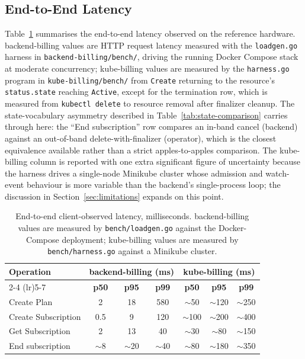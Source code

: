 \subsection{End-to-End Latency}

Table~\ref{tab:e2e-latency} summarises the end-to-end latency observed on the reference hardware. backend-billing values are HTTP request latency measured with the \texttt{loadgen.go} harness in \texttt{backend-billing/bench/}, driving the running Docker Compose stack at moderate concurrency; kube-billing values are measured by the \texttt{harness.go} program in \texttt{kube-billing/bench/} from \texttt{Create} returning to the resource's \texttt{status.state} reaching \texttt{Active}, except for the termination row, which is measured from \texttt{kubectl delete} to resource removal after finalizer cleanup. The state-vocabulary asymmetry described in Table~\ref{tab:state-comparison} carries through here: the ``End subscription'' row compares an in-band cancel (backend) against an out-of-band delete-with-finalizer (operator), which is the closest equivalence available rather than a strict apples-to-apples comparison. The kube-billing column is reported with one extra significant figure of uncertainty because the harness drives a single-node Minikube cluster whose admission and watch-event behaviour is more variable than the backend's single-process loop; the discussion in Section~\ref{sec:limitations} expands on this point.

\begin{table}[h]
\centering
\small
\caption{End-to-end client-observed latency, milliseconds. backend-billing values are measured by \texttt{bench/loadgen.go} against the Docker-Compose deployment; kube-billing values are measured by \texttt{bench/harness.go} against a Minikube cluster.}
\label{tab:e2e-latency}
\begin{tabularx}{\textwidth}{@{}l c c c c c c@{}}
\toprule
\textbf{Operation} & \multicolumn{3}{c}{\textbf{backend-billing (ms)}} & \multicolumn{3}{c}{\textbf{kube-billing (ms)}} \\
\cmidrule(lr){2-4} \cmidrule(lr){5-7}
& \textbf{p50} & \textbf{p95} & \textbf{p99} & \textbf{p50} & \textbf{p95} & \textbf{p99} \\ \midrule
Create Plan          & 2    & 18  & 580   & $\sim$50  & $\sim$120 & $\sim$250 \\
Create Subscription  & 0.5  & 9   & 120   & $\sim$100 & $\sim$200 & $\sim$400 \\
Get Subscription     & 2    & 13  & 40    & $\sim$30  & $\sim$80  & $\sim$150 \\
End subscription     & $\sim$8 & $\sim$20 & $\sim$40 & $\sim$80  & $\sim$180 & $\sim$350 \\ \bottomrule
\end{tabularx}
\end{table}

